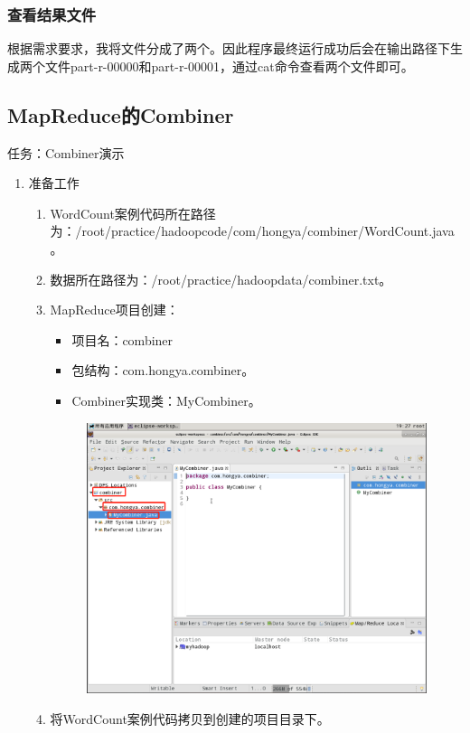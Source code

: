 \documentclass {article}
\begin{document}
			\subsubsection{查看结果文件}
				根据需求要求，我将文件分成了两个。因此程序最终运行成功后会在输出路径下生成两个文件part-r-00000和part-r-00001，通过cat命令查看两个文件即可。
				
		\subsection{MapReduce的Combiner}
			任务：Combiner演示
				\begin{enumerate}
					\item 准备工作
					\begin{enumerate}
						\item WordCount案例代码所在路径为：/root/practice/hadoopcode/com/hongya/combiner/WordCount.java。
						\item 数据所在路径为：/root/practice/hadoopdata/combiner.txt。
						\item MapReduce项目创建：
						\begin{itemize}
							\item 项目名：combiner
							\item 包结构：com.hongya.combiner。
							\item Combiner实现类：MyCombiner。
						\end{itemize}
						\begin{figure}[H]
							\centering
							\includegraphics[width=4.5in]{figures/fig15.jpg}
						\end{figure}
					
						\item 将WordCount案例代码拷贝到创建的项目目录下。
					\end{enumerate}
				

\end{enumerate}
\end{document}
